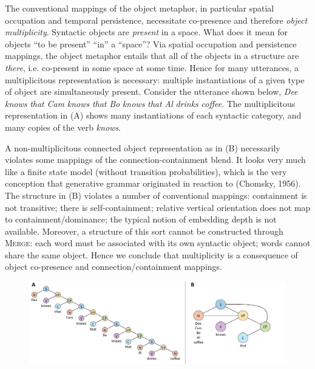 The conventional mappings of the object metaphor, in particular spatial occupation and temporal persistence, necessitate co-presence and therefore \textit{object} \textit{multiplicity}. Syntactic objects are \textit{present} in a space. What does it mean for objects “to be present” “in” a “space”? Via spatial occupation and persistence mappings, the object metaphor entails that all of the objects in a structure are \textit{there}, i.e. co-present in some space at some time. Hence for many utterances, a multiplicitous representation is necessary: multiple instantiations of a given type of object are simultaneously present. Consider the utterance shown below, \textit{Dee} \textit{knows} \textit{that} \textit{Cam} \textit{knows} \textit{that} \textit{Bo} \textit{knows} \textit{that} \textit{Al} \textit{drinks} \textit{coffee}. The multiplicitous representation in (A) shows many instantiations of each syntactic category, and many copies of the verb \textit{knows}.

  A non-multiplicitous connected object representation as in (B) necessarily violates some mappings of the connection-containment blend. It looks very much like a finite state model (without transition probabilities), which is the very conception that generative grammar originated in reaction to (Chomsky, 1956). The structure in (B) violates a number of conventional mappings: containment is not transitive; there is self-containment; relative vertical orientation does not map to containment/dominance; the typical notion of embedding depth is not available. Moreover, a structure of this sort cannot be constructed through \textsc{Merge}: each word must be associated with its own syntactic object; words cannot share the same object. Hence we conclude that multiplicity is a consequence of object co-presence and connection/containment mappings.

  
\begin{figure}
\includegraphics[width=\textwidth]{figures/Tilsen-img36.png}
\caption{\missingcaption}
\label{fig:}
\end{figure}
 

